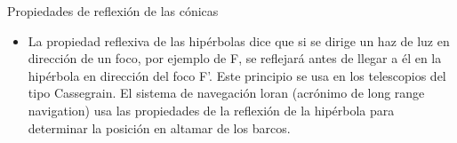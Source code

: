 \begin{myalertblock}{Propiedades de reflexión de las cónicas}
\begin{itemize}
Otra aplicación importante de la reflexión en la elipse es la usada en  \emph{litotricia}, que es un tratamiento para eliminar piedras de los riñones. El paciente es colocado en una bañera de agua con secciones transversales elípticas, en forma tal que la piedra del riñón queda localizada de una manera precisa en un foco. Ondas de sonido de alta intensidad generadas en el otro foco son reflejadas a la piedra y ésta queda destruida con daño mínimo al tejido circundante. El paciente se salva del trauma de una cirugía y se recupera en días en lugar de semanas.

\item La propiedad reflexiva de las hipérbolas dice que si se dirige un haz de luz en dirección de un foco, por ejemplo de F, se reflejará antes de llegar a él en la hipérbola en dirección del foco F'. Este principio se usa en los telescopios del tipo Cassegrain. El sistema de navegación loran (acrónimo de long range navigation) usa las propiedades de la reflexión de la hipérbola para determinar la posición en altamar de los barcos.
\end{itemize}
	
\end{myalertblock}


\vspace{5mm}


